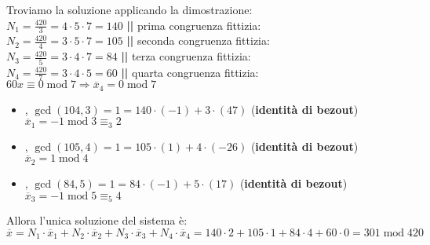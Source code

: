 \begin{boxA}
    Troviamo la soluzione applicando la dimostrazione: \\
    $N_1 = \frac{420}{3} = 4 \cdot 5 \cdot 7 = 140$ \textbf{||} prima congruenza fittizia:  \\
    $N_2 = \frac{420}{4} = 3 \cdot 5 \cdot 7 = 105$ \textbf{||} seconda congruenza fittizia:  \\
    $N_3 = \frac{420}{5} = 3 \cdot 4 \cdot 7 = 84$ \textbf{||} terza congruenza fittizia:  \\
    $N_4 = \frac{420}{7} = 3 \cdot 4 \cdot 5 = 60$ \textbf{||} quarta congruenza fittizia: $60x \equiv 0 \; \text{mod} \; 7 \Rightarrow \overline{x}_4 = 0 \; \text{mod} \; 7$
    \begin{itemize}[nosep]
        \item {}, $\gcd (104, 3) = 1 = 140 \cdot (-1) + 3 \cdot (47)$ (\textbf{identità di bezout}) \\
        $\overline{x}_1 = -1 \; \text{mod} \; 3 \equiv_{3} 2$
        \item {}, $\gcd (105, 4) = 1 = 105 \cdot (1) + 4 \cdot (-26)$ (\textbf{identità di bezout}) \\
        $\overline{x}_2 = 1 \; \text{mod} \; 4$
        \item {}, $\gcd (84, 5) = 1 = 84 \cdot (-1) + 5 \cdot (17)$ (\textbf{identità di bezout}) \\
        $\overline{x}_3 = -1 \; \text{mod} \; 5 \equiv_5 4$
    \end{itemize}
    Allora l'unica soluzione del sistema è: $\overline{x} = N_1 \cdot \overline{x}_1 + N_2 \cdot \overline{x}_2 + N_3 \cdot \overline{x}_3 + N_4 \cdot \overline{x}_4 = 140 \cdot 2 + 105 \cdot 1 + 84 \cdot 4 + 60 \cdot 0 = 301 \; \text{mod} \; 420$
\end{boxA}


